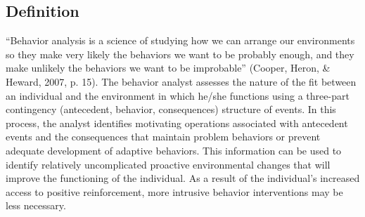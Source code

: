 \subsection{Definition}
``Behavior analysis is a science of studying how we can arrange our environments so they make very likely the behaviors we want to be probably enough, and they make unlikely the behaviors we want to be improbable'' (Cooper, Heron, \& Heward, 2007, p. 15). The behavior analyst assesses the nature of the fit between an individual and the environment in which he/she functions using a three-part contingency (antecedent, behavior, consequences) structure of events. In this process, the analyst identifies motivating operations associated with antecedent events and the consequences that maintain problem behaviors or prevent adequate development of adaptive behaviors. This information can be used to identify relatively uncomplicated proactive environmental changes that will improve the functioning of the individual. As a result of the individual's increased access to positive reinforcement, more intrusive behavior interventions may be less necessary. 
%
